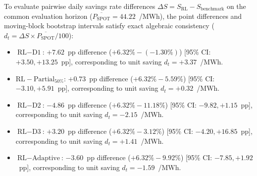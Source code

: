 \begin{table}[htbp]
\end{table}

To evaluate pairwise daily savings rate differences $\Delta S = S_{\text{RL}} - S_{\text{benchmark}}$ on the common evaluation horizon ($\overline{P_{\text{SPOT}}} = 44.22$~\texteuro/MWh), the point differences and moving-block bootstrap intervals satisfy exact algebraic consistency ($d_t = \Delta S \times \overline{P_{\text{SPOT}}} / 100$):
\begin{itemize}
    \item $\text{RL} - \text{D1}$: $+7.62$~pp difference ($+6.32\% - (-1.30\%)$) [95\% CI: $+3.50, +13.25$~pp], corresponding to unit saving $d_t = +3.37$~\texteuro/MWh.
    \item $\text{RL} - \text{Partial}_{50\%}$: $+0.73$~pp difference ($+6.32\% - 5.59\%$) [95\% CI: $-3.10, +5.91$~pp], corresponding to unit saving $d_t = +0.32$~\texteuro/MWh.
    \item $\text{RL} - \text{D2}$: $-4.86$~pp difference ($+6.32\% - 11.18\%$) [95\% CI: $-9.82, +1.15$~pp], corresponding to unit saving $d_t = -2.15$~\texteuro/MWh.
    \item $\text{RL} - \text{D3}$: $+3.20$~pp difference ($+6.32\% - 3.12\%$) [95\% CI: $-4.20, +16.85$~pp], corresponding to unit saving $d_t = +1.41$~\texteuro/MWh.
    \item $\text{RL} - \text{Adaptive}$: $-3.60$~pp difference ($+6.32\% - 9.92\%$) [95\% CI: $-7.85, +1.92$~pp], corresponding to unit saving $d_t = -1.59$~\texteuro/MWh.
\end{itemize}

